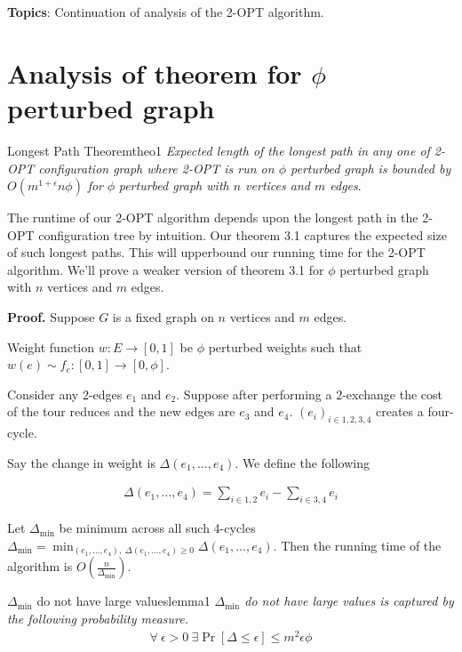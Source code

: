 \documentclass[12pt, a4paper]{article}
\begin{document}
\MakeScribeTop

\textbf{Topics}: Continuation of analysis of the 2-{\sf OPT} algorithm.

\section{Analysis of theorem for $\phi$ perturbed graph}

\begin{theo}{Longest Path Theorem}{theo1}
    \textit{Expected length of the longest path in any one of 2-{\sf OPT}
    configuration graph where 2-{\sf OPT} is run on $\phi$ perturbed graph
    is bounded by} $O(m^{1 + \epsilon} n \phi)$ \textit{for} $\phi$ \textit{perturbed graph
        with $n$ vertices and $m$ edges}.

\end{theo}

\noindent The runtime of our 2-{\sf OPT} algorithm depends upon the
longest path in the 2-{\sf OPT} configuration tree by intuition.
Our theorem 3.1 captures the expected size of such longest paths.
This will upperbound our running time for the 2-{\sf OPT} algorithm.
We'll prove a weaker version of theorem 3.1 for $\phi$ perturbed graph with $n$ vertices and $m$ edges.

\bigskip

\noindent \textbf{Proof.} Suppose $G$ is a fixed graph on $n$ vertices and $m$ edges.

\noindent Weight function $w:E \to [0,1]$ be $\phi$ perturbed weights such that $w(e) \sim f_e:[0,1] \to [0, \phi]$.

\noindent Consider any 2-edges $e_1$ and $e_2$. Suppose after performing a 2-exchange the cost of the tour reduces and the new edges are $e_3$ and $e_4$. $(e_i)_{i \in {1,2,3,4}}$ creates a four-cycle.

\noindent Say the change in weight is $\Delta(e_1, \dots, e_4)$. We define the following

\begin{align*}
    \Delta(e_1, \dots, e_4) = \displaystyle\sum_{i \in {1,2}} e_i - \displaystyle\sum_{i \in {3,4}} e_i
\end{align*}

\noindent Let $\Delta_{\text{min}}$ be minimum across all such 4-cycles $\Delta_{\text{min}} = \min_{(e_1, \dots, e_4), \: \Delta(e_1, \dots, e_4) \geq 0} \Delta(e_1, \dots, e_4)$.
Then the running time of the algorithm is $O(\frac{n}{\Delta_{\text{min}}})$.

\begin{lemma}{$\Delta_{\text{min}}$ do not have large values}{lemma1}
    \textit{$\Delta_{\text{min}}$ do not have large values is captured by the following probability measure.}
    \begin{align*}
        \forall \: \epsilon > 0 \: \exists \Pr[\Delta \leq \epsilon] \leq m^2 \epsilon \phi
    \end{align*}
\end{lemma}
\end{document}
